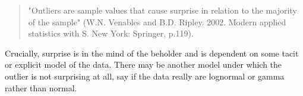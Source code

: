 \begin{quote}
"Outliers are sample values that cause surprise in relation to the majority of the sample" (W.N. Venables and B.D. Ripley. 2002. Modern applied statistics with S. New York: Springer, p.119).
\end{quote}

Crucially, surprise is in the mind of the beholder and is dependent on some tacit or explicit model of the data. There may be another model under which the outlier is not surprising at all, say if the data really are lognormal or gamma rather than normal.


